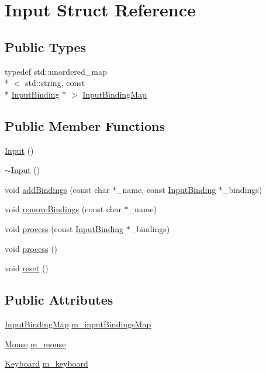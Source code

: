 \hypertarget{struct_input}{\section{Input Struct Reference}
\label{struct_input}
}
\subsection*{Public Types}
\begin{DoxyCompactItemize}
\item 
typedef std\+::unordered\+\_\+map\\*
$<$ std\+::string, const \\*
\hyperlink{struct_input_binding}{Input\+Binding} $\ast$ $>$ \hyperlink{struct_input_a89b980cb6a99a7390101f2b9df56c93e}{Input\+Binding\+Map}
\end{DoxyCompactItemize}
\subsection*{Public Member Functions}
\begin{DoxyCompactItemize}
\item 
\hyperlink{struct_input_abae3f379d3f157cf42dc857309832dba}{Input} ()
\item 
\hyperlink{struct_input_af2db35ba67c8a8ccd23bef6a482fc291}{$\sim$\+Input} ()
\item 
void \hyperlink{struct_input_a39f869e3b086c0f1d5bf56dd070167cd}{add\+Bindings} (const char $\ast$\+\_\+name, const \hyperlink{struct_input_binding}{Input\+Binding} $\ast$\+\_\+bindings)
\item 
void \hyperlink{struct_input_ab4d4895ae60387866d893446dd14be2f}{remove\+Bindings} (const char $\ast$\+\_\+name)
\item 
void \hyperlink{struct_input_a7018dc93fb58a3a177c80442692bb2a9}{process} (const \hyperlink{struct_input_binding}{Input\+Binding} $\ast$\+\_\+bindings)
\item 
void \hyperlink{struct_input_a4351ec32af6df8957ef270d5ba7ffd58}{process} ()
\item 
void \hyperlink{struct_input_a8bec96dd53baf5ec754c199af3c957c8}{reset} ()
\end{DoxyCompactItemize}
\subsection*{Public Attributes}
\begin{DoxyCompactItemize}
\item 
\hyperlink{struct_input_a89b980cb6a99a7390101f2b9df56c93e}{Input\+Binding\+Map} \hyperlink{struct_input_a7903cb0f8b40205cb5732115b1729efb}{m\+\_\+input\+Bindings\+Map}
\item 
\hyperlink{struct_mouse}{Mouse} \hyperlink{struct_input_acab349ae5eebd1c04bd2b1a38ed8cd7e}{m\+\_\+mouse}
\item 
\hyperlink{struct_keyboard}{Keyboard} \hyperlink{struct_input_a8caf87f551f51c9b466c0aeaa04853b4}{m\+\_\+keyboard}
\end{DoxyCompactItemize}


